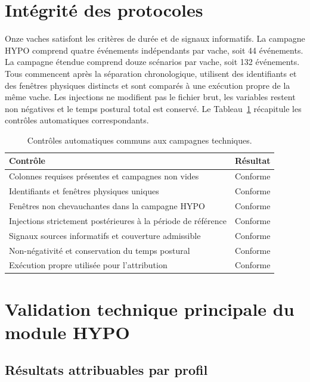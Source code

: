 \section{Intégrité des protocoles}

Onze vaches satisfont les critères de durée et de signaux informatifs. La campagne HYPO
comprend quatre événements indépendants par vache, soit 44 événements. La campagne étendue
comprend douze scénarios par vache, soit 132 événements. Tous commencent après la séparation
chronologique, utilisent des identifiants et des fenêtres physiques distincts et sont
comparés à une exécution propre de la même vache. Les injections ne modifient pas le fichier
brut, les variables restent non négatives et le temps postural total est conservé. Le
Tableau~\ref{tab:protocol_checks} récapitule les contrôles automatiques correspondants.

\begin{table}[H]
  \centering
  \caption{Contrôles automatiques communs aux campagnes techniques.}
  \label{tab:protocol_checks}
  \begin{tabular}{p{}c}
    \toprule
    Contrôle & Résultat \\
    \midrule
    Colonnes requises présentes et campagnes non vides & Conforme \\
    Identifiants et fenêtres physiques uniques & Conforme \\
    Fenêtres non chevauchantes dans la campagne HYPO & Conforme \\
    Injections strictement postérieures à la période de référence & Conforme \\
    Signaux sources informatifs et couverture admissible & Conforme \\
    Non-négativité et conservation du temps postural & Conforme \\
    Exécution propre utilisée pour l'attribution & Conforme \\
    \bottomrule
  \end{tabular}
\end{table}

\section{Validation technique principale du module HYPO}

\subsection{Résultats attribuables par profil}

